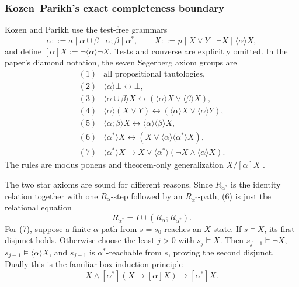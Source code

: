 \subsubsection{Kozen--Parikh's exact completeness boundary}

Kozen and Parikh use the test-free grammars
\[
 \alpha::=a\mid\alpha\cup\beta\mid\alpha;\beta\mid\alpha^{*},
 \qquad
 X::=p\mid X\lor Y\mid\neg X\mid\langle\alpha\rangle X,
\]
and define \([\alpha]X:=\neg\langle\alpha\rangle\neg X\).  Tests and converse
are explicitly omitted.  In the paper's diamond notation, the seven
Segerberg axiom groups are
\[
\begin{array}{rll}
 (1)&\text{all propositional tautologies},\\
 (2)&\langle\alpha\rangle\bot\leftrightarrow\bot,\\
 (3)&\langle\alpha\cup\beta\rangle X
       \leftrightarrow
       (\langle\alpha\rangle X\lor\langle\beta\rangle X),\\
 (4)&\langle\alpha\rangle(X\lor Y)
       \leftrightarrow
       (\langle\alpha\rangle X\lor\langle\alpha\rangle Y),\\
 (5)&\langle\alpha;\beta\rangle X
       \leftrightarrow\langle\alpha\rangle\langle\beta\rangle X,\\
 (6)&\langle\alpha^{*}\rangle X
       \leftrightarrow
       (X\lor\langle\alpha\rangle\langle\alpha^{*}\rangle X),\\
 (7)&\langle\alpha^{*}\rangle X
       \to
       X\lor\langle\alpha^{*}\rangle
          (\neg X\land\langle\alpha\rangle X).
\end{array}
\]
The rules are modus ponens and theorem-only generalization
\(X/[\alpha]X\) \cite[pp.~113--114]{KozenParikh1981}.

The two star axioms are sound for different reasons.  Since
\(R_{\alpha^{*}}\) is the identity relation together with one
\(R_{\alpha}\)-step followed by an \(R_{\alpha^{*}}\)-path, (6) is just the
relational equation
\[
 R_{\alpha^{*}}=I\cup(R_{\alpha}\mathbin{;}R_{\alpha^{*}}).
\]
For (7), suppose a finite \(\alpha\)-path from \(s=s_0\) reaches an
\(X\)-state.  If \(s\models X\), its first disjunct holds.  Otherwise choose the
least \(j>0\) with \(s_j\models X\).  Then \(s_{j-1}\models\neg X\),
\(s_{j-1}\models\langle\alpha\rangle X\), and \(s_{j-1}\) is
\(\alpha^{*}\)-reachable from \(s\), proving the second disjunct.  Dually this is
the familiar box induction principle
\[
 X\land[\alpha^{*}](X\to[\alpha]X)\to[\alpha^{*}]X.
\]

